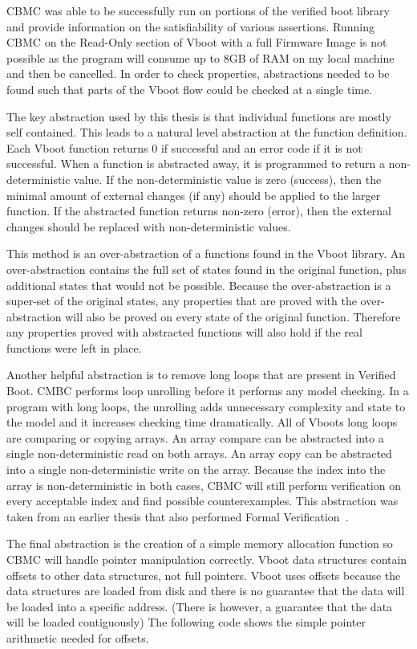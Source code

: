 \documentclass[../report.tex]{subfiles}
\begin{document}
CBMC was able to be successfully run on portions of the verified boot library and provide information on the satisfiability of various assertions.
Running CBMC on the Read-Only section of Vboot with a full Firmware Image is not possible as the program will consume up to 8GB of RAM on my local machine and then be cancelled.
In order to check properties, abstractions needed to be found such that parts of the Vboot flow could be checked at a single time.

The key abstraction used by this thesis is that individual functions are mostly
self contained.
This leads to a natural level abstraction at the function definition.
Each Vboot function returns 0 if successful and an error code if it is not successful.
When a function is abstracted away, it is programmed to return a
non-deterministic value.
If the non-deterministic value is zero (success), then the minimal amount of external changes (if any) should be applied to the larger function.
If the abstracted function returns non-zero (error), then the external changes should be replaced with non-deterministic values.

This method is an over-abstraction of a functions found in the Vboot library.
An over-abstraction contains the full set of states found in the original function, plus additional states that would not be possible.
Because the over-abstraction is a super-set of the original states, any properties that are proved with the over-abstraction will also be proved on every state of the original function.
Therefore any properties proved with abstracted functions will also hold if the real functions were left in place.

Another helpful abstraction is to remove long loops that are present in Verified
Boot.
CMBC performs loop unrolling before it performs any model checking. 
In a program with long loops, the unrolling adds unnecessary complexity and
state to the model and it increases checking time dramatically.
All of Vboots long loops are comparing or copying arrays.
An array compare can be abstracted into a single non-deterministic read on both
arrays.
An array copy can be abstracted into a single non-deterministic write on the
array.
Because the index into the array is non-deterministic in both cases, CBMC will
still perform verification on every acceptable index and find possible
counterexamples.
This abstraction was taken from an earlier thesis that also performed Formal
Verification~\cite{elane}. 

The final abstraction is the creation of a simple memory allocation function so
CBMC will handle pointer manipulation correctly.
Vboot data structures contain offsets to other data structures, not full
pointers. 
Vboot uses offsets because the data structures are loaded from disk and there is
no guarantee that the data will be loaded into a specific address.
(There is however, a guarantee that the data will be loaded contiguously)
The following code shows the simple pointer arithmetic needed for offsets.
\end{document}
